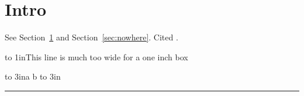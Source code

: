 \documentclass{article}
\begin{document}
\section{Intro}\label{sec:intro}
See Section~\ref{sec:intro} and Section~\ref{sec:nowhere}.
Cited \cite{knuth1984}.

\hbox to 1in{This line is much too wide for a one inch box}

\hbox to 3in{a b}
\vbox to 3in{\hrule}
\end{document}
